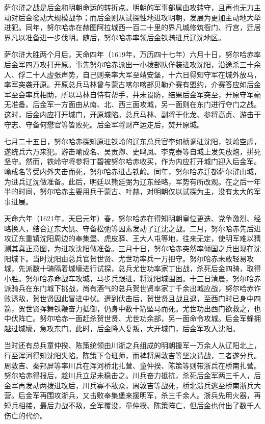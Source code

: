 萨尔浒之战是后金和明朝命运的转折点。明朝的军事部属由攻转守，且再也无力主动对后金發动大规模战争；而后金则从试探性地进攻明朝，发展为更加主动地大举进犯。同年，努尔哈赤在赫图阿拉城西一百二十里的界凡城修筑衙门、行宫，迁居界凡以准备进一步伐明。随后，努尔哈赤率领后金铁骑进兵辽沈地区。

萨尔浒大胜两个月后，天命四年（1619年，万历四十七年）六月十日，努尔哈赤率后金军四万攻打开原。事先努尔哈赤派出一小拨部队佯装进攻沈阳，沿途杀三十余人、俘二十人虚张声势，自己则亲率大军至靖安堡，十六日得知守军在城外放马，率军突袭开原。开原总兵马林曾与蒙古喀尔喀部贝勒介赛有盟约，介赛答应如后金军至会率兵相助，所以马林自恃有帮手，并未设防，结果后金军突至，开原守军毫无准备。后金军一方面由从南、北、西三面攻城，另一面则在东门进行夺门之战。这时，后金内应打开城门，开原城陷。总兵马林、副将于化龙、参将高贞、游击于守志、守备何懋官等皆败死。后金军将财产运走后，焚开原城。

七月二十五日，努尔哈赤探知原驻铁岭的辽东总兵官李如桢调驻沈阳，铁岭空虚，遂统兵六万来犯。游击喻成名、吴贡卿、史鸣凤、李克泰等自城上发矢放炮，拼死坚守。然而，铁岭守将参将丁碧被努尔哈赤收买，作为内应打开城门迎入后金军。喻成名等受内外夹击而死，努尔哈赤进占铁岭。同年，努尔哈赤迁都萨尔浒山城，为进兵辽沈做准备。此后，明廷以熊廷弼为辽东经略，军势有所改观。在之后一年半的时间，努尔哈赤主要用兵于蒙古、叶赫，对明朝仅以试探为主，没有太大的军事进展。

天命六年（1621年，天启元年）春，努尔哈赤在得知明朝皇位更迭、党争激烈、经略换人，结合辽东大饥、守备松弛等因素发动了辽沈之战。二月，努尔哈赤先后进攻辽东重镇沈阳周边的奉集堡、虎皮驿、王大人屯等地，往来无定，使明军难以猜测其真正意图，为进攻沈阳做准备。三月十日，努尔哈赤突然率倾国之兵出现在沈阳城下。当时沈阳由总兵官贺世贤、尤世功率兵一万把守。努尔哈赤未敢轻易攻城，先派数十骑隔着城壕进行试探，总兵尤世功率家丁出战，杀死后金四骑，取得小胜。努尔哈赤命战车攻城，马步兵跟进，将沈阳城围困。十三日清晨，努尔哈赤派骑兵在东门城下挑战，尚有酒气的总兵贺世贤率家丁千余出城应战，努尔哈赤诈败诱敌，贺世贤因此冒进中伏。遭到伏击后，贺世贤且战且退，至西门时已身中四箭，贺世贤挥舞铁鞭奋力抵御，仍身中数十箭坠马而死。尤世功出西门欲救之，也中伏阵亡。努尔哈赤一面赶杀贺世贤、尤世功余部，另一面命令攻城。后金军蜂拥越过城壕，急攻东门。此时，后金降人复叛，大开城门，后金军攻入沈阳。

当时还有总兵童仲揆、陈策统领由川浙之兵组成的明朝援军一万余人从辽阳北上，行至浑河得知沈阳失陷。陈策下令班师，而裨将周敦吉等坚决请战，二者遂分兵。周敦吉、秦邦屏等率川兵在浑河桥北扎营、童仲揆、陈策等则带浙兵在桥南扎营。努尔哈赤得报后，趁川兵立足未稳击之。川兵奋力抵抗，杀死后金军两三千人，后金军再发动两拨进攻后，川兵寡不敌众，周敦吉等战死，桥北溃兵逃至桥南浙兵大营。后金军再围攻浙兵，又击败奉集堡来援明军，杀三千余人。浙兵先用火器，再短兵相接，最后力战不敌，全军覆没，童仲揆、陈策阵亡，但后金也付出了数千人伤亡的代价。

